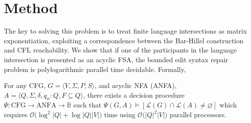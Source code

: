 \documentclass[sigplan,review,acmsmall,nonacm,screen,anonymous]{acmart}\settopmatter{printfolios=false,printccs=false,printacmref=false}
\begin{document}

\clearpage\section{Method}\label{sec:method}

The key to solving this problem is to treat finite language intersections as matrix exponentiation, exploiting a correspondence between the Bar-Hillel construction and CFL reachability. We show that if one of the participants in the language intersection is presented as an acyclic FSA, the bounded edit syntax repair problem is polylogarithmic parallel time decidable. Formally,

\begin{theorem}\label{thm:parallel_decision_complexity}
  For any CFG, $G = \langle V, \Sigma, P, S\rangle$, and acyclic NFA (ANFA), $A = \langle Q, \Sigma, \delta, q_\alpha: Q, F \subseteq Q\rangle$, there exists a decision procedure $\Psi: \text{CFG} \rightarrow \text{ANFA} \rightarrow \mathbb{B}$ such that $\Psi(G, A) \models [\mathcal{L}(G)\cap\mathcal{L}(A) \neq \varnothing]$ which requires $\mathcal{O}\big(\log^2|Q|+\log|Q||V|\big)$ time using $\mathcal{O}\big(|Q|^2|V|\big)$ parallel processors.
\end{theorem}
\end{document}
